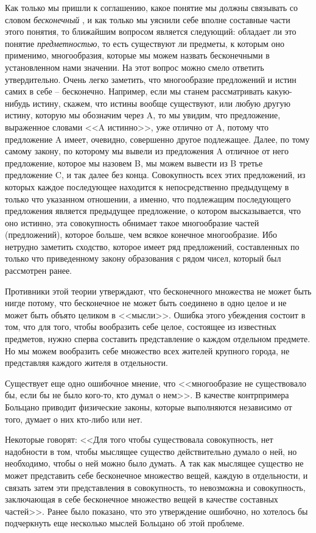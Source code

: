 \documentclass[12pt]{extarticle}
\begin{document}
Как только мы пришли к соглашению, какое понятие мы должны связывать со словом \textit{бесконечный} , и как только мы уяснили себе вполне составные части этого понятия, то ближайшим вопросом является следующий: обладает ли это понятие \textit{предметностью}, то есть существуют ли предметы, к которым оно применимо, многообразия, которые мы можем назвать бесконечными в установленном нами значении. На этот вопрос можно смело ответить утвердительно. Очень легко заметить, что многообразие предложений и истин самих в себе -- бесконечно. Например, если мы станем рассматривать какую-нибудь истину, скажем, что истины вообще существуют, или любую другую истину, которую мы обозначим через A, то мы увидим, что предложение, выраженное словами <<A истинно>>, уже отлично от A, потому что предложение A имеет, очевидно, совершенно другое подлежащее. Далее, по тому самому закону, по которому мы вывели из предложения A отличное от него предложение, которое мы назовем B, мы можем вывести из B третье предложение C, и так далее без конца. Совокупность всех этих предложений, из которых каждое последующее находится к непосредственно предыдущему в только что указанном отношении, а именно, что подлежащим последующего предложения является предыдущее предложение, о котором высказывается, что оно истинно, эта совокупность обнимает такое многообразие частей (предложений), которое больше, чем всякое конечное многообразие. Ибо нетрудно заметить сходство, которое имеет ряд предложений, составленных по только что приведенному закону образования с рядом чисел, который был рассмотрен ранее.

Противники этой теории утверждают, что бесконечного множества не может быть нигде потому, что бесконечное не может быть соединено в одно целое и не может быть объято целиком в <<мысли>>. Ошибка этого убеждения состоит в том, что для того, чтобы вообразить себе целое, состоящее из известных предметов, нужно сперва составить представление о каждом отдельном предмете. Но мы можем вообразить себе множество всех жителей крупного города, не представляя каждого жителя в отдельности.

Существует еще одно ошибочное мнение, что <<многообразие не существовало бы, если бы не было кого-то, кто думал о нем>>. В качестве контрпримера Больцано приводит физические законы, которые выполняются независимо от того, думает о них кто-либо или нет.

Некоторые говорят: <<Для того чтобы существовала
совокупность, нет надобности в том, чтобы мыслящее существо
действительно думало о ней, но необходимо, чтобы о
ней можно было думать. А так как мыслящее существо не может
представить себе бесконечное множество вещей, каждую в отдельности, и
связать затем эти представления в совокупность, то невозможна и
совокупность, заключающая в себе бесконечное множество вещей в
качестве составных частей>>. Ранее было показано, что это утверждение ошибочно, но хотелось бы подчеркнуть еще несколько мыслей Больцано об этой проблеме.
\end{document}
